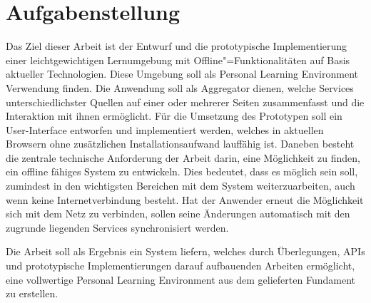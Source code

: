 \section{Aufgabenstellung}
Das Ziel dieser Arbeit ist der Entwurf und die prototypische Implementierung einer leichtgewichtigen Lernumgebung mit Offline"=Funktionalitäten auf Basis aktueller Technologien. Diese Umgebung soll als Personal Learning Environment Verwendung finden. Die Anwendung soll als Aggregator dienen, welche Services unterschiedlichster Quellen auf einer oder mehrerer Seiten zusammenfasst und die Interaktion mit ihnen ermöglicht. Für die Umsetzung des Prototypen soll ein User-Interface entworfen und implementiert werden, welches in aktuellen Browsern ohne zusätzlichen Installationsaufwand lauffähig ist. Daneben besteht die zentrale technische Anforderung der Arbeit darin, eine Möglichkeit zu finden, ein offline fähiges System zu entwickeln. Dies bedeutet, dass es möglich sein soll, zumindest in den wichtigsten Bereichen mit dem System weiterzuarbeiten, auch wenn keine Internetverbindung besteht. Hat der Anwender erneut die Möglichkeit sich mit dem Netz zu verbinden, sollen seine Änderungen automatisch mit den zugrunde liegenden Services synchronisiert werden.

Die Arbeit soll als Ergebnis ein System liefern, welches durch Überlegungen, APIs und prototypische Implementierungen darauf aufbauenden Arbeiten ermöglicht, eine vollwertige Personal Learning Environment aus dem gelieferten Fundament zu erstellen.

